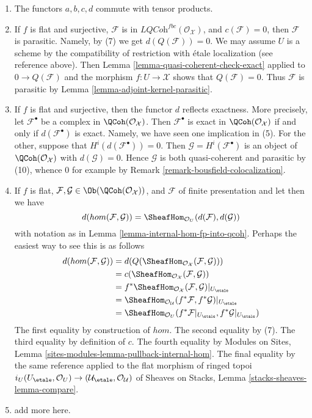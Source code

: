 \begin{enumerate}
\item The functors $a, b, c, d$ commute with tensor products.
\item If $f$ is flat and surjective, $\mathcal{F}$ is in
$\textit{LQCoh}^{fbc}(\mathcal{O}_\mathcal{X})$, and $c(\mathcal{F}) = 0$,
then $\mathcal{F}$ is parasitic. Namely, by (7) we get $d(Q(\mathcal{F})) = 0$.
We may assume $U$ is a scheme by the compatibility of restriction
with \'etale localization (see reference above). Then
Lemma \ref{lemma-quasi-coherent-check-exact} applied to $0 \to Q(\mathcal{F})$
and the morphism $f : U \to \mathcal{X}$ shows that $Q(\mathcal{F}) = 0$.
Thus $\mathcal{F}$ is parasitic by Lemma \ref{lemma-adjoint-kernel-parasitic}.
\item If $f$ is flat and surjective, then the functor $d$
reflects exactness. More precisely, let $\mathcal{F}^\bullet$ be a complex in
$\QCoh(\mathcal{O}_\mathcal{X})$. Then $\mathcal{F}^\bullet$ is exact
in $\QCoh(\mathcal{O}_\mathcal{X})$ if and only if $d(\mathcal{F}^\bullet)$
is exact. Namely, we have seen one implication in (5). For the other,
suppose that $H^i(d(\mathcal{F}^\bullet)) = 0$. Then
$\mathcal{G} = H^i(\mathcal{F}^\bullet)$ is an object of
$\QCoh(\mathcal{O}_\mathcal{X})$ with $d(\mathcal{G}) = 0$.
Hence $\mathcal{G}$ is both quasi-coherent and parasitic by (10),
whence $0$ for example by Remark \ref{remark-bousfield-colocalization}.
\item
\label{item-hom-restriction}
If $f$ is flat,
$\mathcal{F}, \mathcal{G} \in \Ob(\QCoh(\mathcal{O}_\mathcal{X}))$,
and $\mathcal{F}$ of finite presentation and let
then we have
$$
d(hom(\mathcal{F}, \mathcal{G})) =
\SheafHom_{\mathcal{O}_U}(d(\mathcal{F}), d(\mathcal{G}))
$$
with notation as in Lemma \ref{lemma-internal-hom-fp-into-qcoh}.
Perhaps the easiest way to see this is as follows
\begin{align*}
d(hom(\mathcal{F}, \mathcal{G}))
& =
d(Q(\SheafHom_{\mathcal{O}_\mathcal{X}}(\mathcal{F}, \mathcal{G}))) \\
& =
c(\SheafHom_{\mathcal{O}_\mathcal{X}}(\mathcal{F}, \mathcal{G})) \\
& =
f^*\SheafHom_{\mathcal{O}_\mathcal{X}}(\mathcal{F}, \mathcal{G})|_{U_\etale} \\
& =
\SheafHom_{\mathcal{O}_\mathcal{U}}(f^*\mathcal{F},
f^*\mathcal{G})|_{U_\etale} \\
& =
\SheafHom_{\mathcal{O}_U}(f^*\mathcal{F}|_{U_\etale},
f^*\mathcal{G}|_{U_\etale})
\end{align*}
The first equality by construction of $hom$. The second equality
by (7). The third equality by definition of $c$. The fourth equality
by Modules on Sites, Lemma \ref{sites-modules-lemma-pullback-internal-hom}.
The final equality by the same reference applied to the flat morphism
of ringed topoi $i_U (U_\etale, \mathcal{O}_U) \to
(\mathcal{U}_\etale, \mathcal{O}_\mathcal{U})$ of
Sheaves on Stacks, Lemma \ref{stacks-sheaves-lemma-compare}.
\item add more here.
\end{enumerate}






